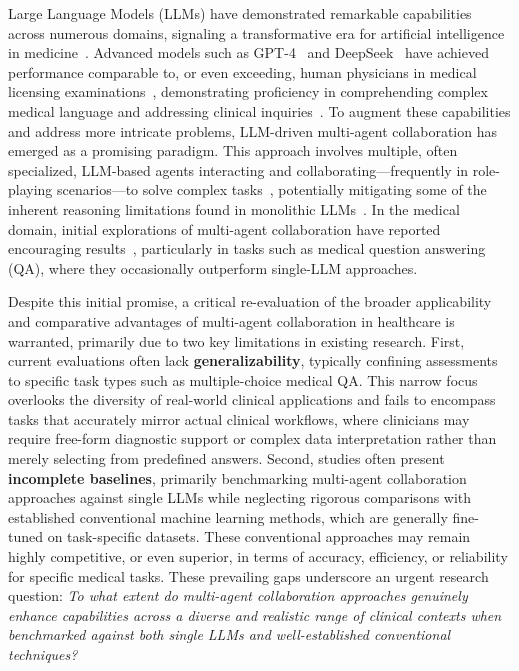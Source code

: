 \documentclass{article}
\begin{document}
Large Language Models (LLMs) have demonstrated remarkable capabilities across numerous domains, signaling a transformative era for artificial intelligence in medicine~\cite{arora2023promise,huang2025foundation}. Advanced models such as GPT-4~\cite{openai2023gpt4} and DeepSeek~\cite{liu2024deepseekv3,guo2025deepseekr1} have achieved performance comparable to, or even exceeding, human physicians in medical licensing examinations~\cite{uriel2024gpt_vs_physicians, singhal2025toward}, demonstrating proficiency in comprehending complex medical language and addressing clinical inquiries~\cite{clusmann2023future,sandmann2025benchmark}. To augment these capabilities and address more intricate problems, LLM-driven multi-agent collaboration has emerged as a promising paradigm. This approach involves multiple, often specialized, LLM-based agents interacting and collaborating—frequently in role-playing scenarios—to solve complex tasks~\cite{xagent2023}, potentially mitigating some of the inherent reasoning limitations found in monolithic LLMs~\cite{tran2025mas_survey}. In the medical domain, initial explorations of multi-agent collaboration have reported encouraging results~\cite{kim2024mdagents,chen2024reconcile,tang2024medagents}, particularly in tasks such as medical question answering (QA), where they occasionally outperform single-LLM approaches.

Despite this initial promise, a critical re-evaluation of the broader applicability and comparative advantages of multi-agent collaboration in healthcare is warranted, primarily due to two key limitations in existing research. First, current evaluations often lack \textbf{generalizability}, typically confining assessments to specific task types such as multiple-choice medical QA. This narrow focus overlooks the diversity of real-world clinical applications and fails to encompass tasks that accurately mirror actual clinical workflows, where clinicians may require free-form diagnostic support or complex data interpretation rather than merely selecting from predefined answers. Second, studies often present \textbf{incomplete baselines}, primarily benchmarking multi-agent collaboration approaches against single LLMs while neglecting rigorous comparisons with established conventional machine learning methods, which are generally fine-tuned on task-specific datasets. These conventional approaches may remain highly competitive, or even superior, in terms of accuracy, efficiency, or reliability for specific medical tasks. These prevailing gaps underscore an urgent research question: \textit{To what extent do multi-agent collaboration approaches genuinely enhance capabilities across a diverse and realistic range of clinical contexts when benchmarked against both single LLMs and well-established conventional techniques?}
\end{document}
